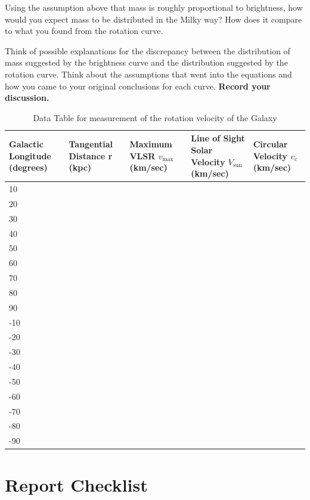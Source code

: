 \begin{steps}
	\item Using the assumption above that mass is roughly proportional to brightness, how would you expect mass to be distributed in the Milky way? How does it compare to what you found from the rotation curve. 
	
	\item Think of possible explanations for the discrepancy between the distribution of mass suggested by the brightness curve and the distribution suggested by the rotation curve. Think about the assumptions that went into the equations and how you came to your original conclusions for each curve. \textbf{Record your discussion.}
	
	
\end{steps}

\begin{table}
	\centering
	\begin{tabular}{|p{3cm}|p{3cm}|p{3cm}|p{3cm}|p{3cm}|}
		\toprule
		Galactic Longitude (degrees) & Tangential Distance r (kpc) & Maximum VLSR $v_\textrm{max}$ (km/sec) & Line of Sight Solar Velocity $V_\textrm{sun}$ (km/sec) & Circular Velocity $v_c$ (km/sec) \\ \midrule 10 & & & & \\ \midrule 20 &&&& \\ \midrule 30 &&&&\\ \midrule 40 &&&& \\ \midrule 50 &&&& \\ \midrule 60 &&&& \\ \midrule 70 &&&& \\ \midrule 80 &&&& \\ \midrule 90 &&&& \\ \midrule -10 &&&& \\ \midrule -20 &&&& \\ \midrule -30 &&&& \\ \midrule -40 &&&& \\ \midrule -50&&&& \\ \midrule -60 &&&& \\ \midrule -70 &&&& \\ \midrule -80 &&&& \\ \midrule -90 &&&& \\ \bottomrule
	\end{tabular}
	\caption{Data Table for measurement of the rotation velocity of the Galaxy}\label{sgr:tab:data}
\end{table}

\section{Report Checklist}

